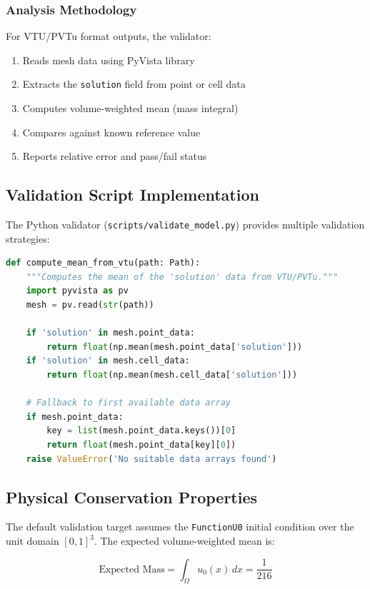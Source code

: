 \documentclass[11pt,a4paper]{article}
\begin{document}
\subsubsection{Analysis Methodology}
For VTU/PVTu format outputs, the validator:
\begin{enumerate}
    \item Reads mesh data using PyVista library
    \item Extracts the \texttt{solution} field from point or cell data
    \item Computes volume-weighted mean (mass integral)
    \item Compares against known reference value
    \item Reports relative error and pass/fail status
\end{enumerate}

\subsection{Validation Script Implementation}

The Python validator (\texttt{scripts/validate\_model.py}) provides multiple validation strategies:

\begin{lstlisting}[language=python]
def compute_mean_from_vtu(path: Path):
    """Computes the mean of the 'solution' data from VTU/PVTu."""
    import pyvista as pv
    mesh = pv.read(str(path))
    
    if 'solution' in mesh.point_data:
        return float(np.mean(mesh.point_data['solution']))
    if 'solution' in mesh.cell_data:
        return float(np.mean(mesh.cell_data['solution']))
    
    # Fallback to first available data array
    if mesh.point_data:
        key = list(mesh.point_data.keys())[0]
        return float(mesh.point_data[key][0])
    raise ValueError('No suitable data arrays found')
\end{lstlisting}

\subsection{Physical Conservation Properties}
The default validation target assumes the \texttt{FunctionU0} initial condition over the unit domain $[0,1]^3$. The expected volume-weighted mean is:

\[
\text{Expected Mass} = \int_{\Omega} u_0(x) \, dx = \frac{1}{216}
\]
\end{document}
